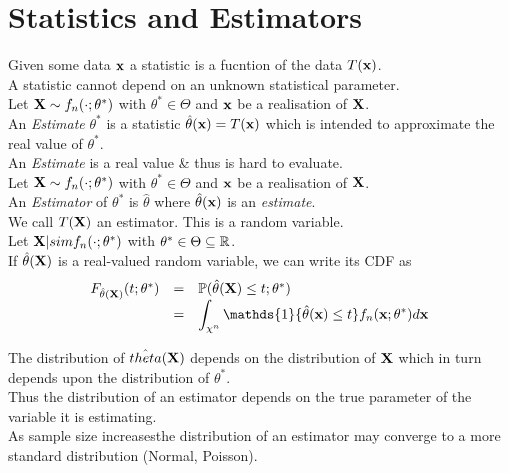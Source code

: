 \documentclass[11pt,a4paper]{article}
\begin{document}
\section{Statistics and Estimators}

Given some data $\textbf{x}$ a statistic is a fucntion of the data $T(\textbf{x})$.\\
\nb A statistic cannot depend on an unknown statistical parameter.\\

Let $\textbf{X}\sim f_n(\cdot;\theta^*)$ with $\theta^*\in\Theta$ and $\textbf{x}$ be a realisation of $\textbf{X}$.\\
An \textit{Estimate} $\theta^*$ is a statistic $\hat{\theta}(\textbf{x})=T(\textbf{x})$ which is intended to approximate the real value of $\theta^*$.\\
\nb An \textit{Estimate} is a real value \& thus is hard to evaluate.\\

Let $\textbf{X}\sim f_n(\cdot;\theta^*)$ with $\theta^*\in\Theta$ and $\textbf{x}$ be a realisation of $\textbf{X}$.\\
An \textit{Estimator} of $\theta^*$ is $\hat{\theta}$ where $\hat{\theta}(\textbf{x})$ is an \textit{estimate}.\\
\nb We call $T(\textbf{X})$ an estimator. This is a random variable.\\

Let $\textbf{X}|sim f_n(\cdot;\theta^*)$ with $\theta^*\in\Theta\subseteq\mathbb{R}$.\\
If $\hat{\theta}(\textbf{X})$ is a real-valued random variable, we can write its CDF as
\[\begin{array}{rcl}
F_{\hat{\theta}(\X)}(t;\theta^*)&=&\prob(\hat{\theta}(\X)\leq t;\theta^*)\\
&=&{\displaystyle \int_{\chi^n}\mathds{1}\{\hat{\theta}(\x)\leq t\}f_n(\x;\theta^*)d\x}
\end{array}\]

The distribution of $\hat{theta}(\textbf{X})$ depends on the distribution of $\textbf{X}$ which in turn depends upon the distribution of $\theta^*$.\\
Thus the distribution of an estimator depends on the true parameter of the variable it is estimating.\\

As sample size increasesthe distribution of an estimator may converge to a more standard distribution (\eg Normal, Poisson).
\end{document}
